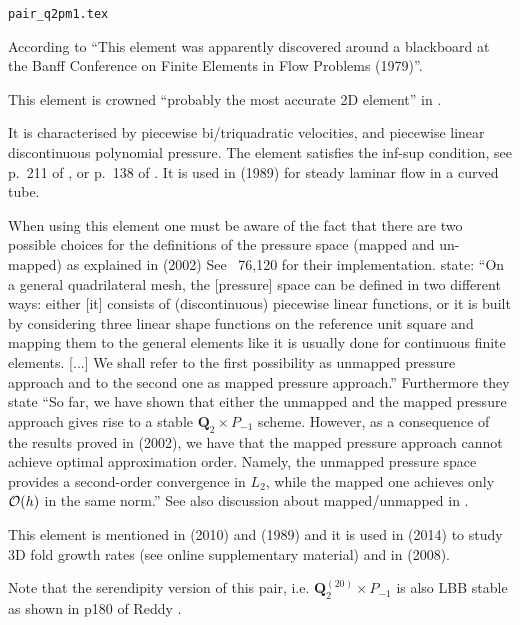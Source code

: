 \begin{flushright} {\tiny {\color{gray} \tt pair\_q2pm1.tex}} \end{flushright}

According to \textcite{bobf08} ``This element was apparently discovered 
around a blackboard at the Banff Conference on Finite Elements in Flow Problems (1979)''.

\begin{center}

\end{center}

This element is crowned ``probably the most accurate 2D element''
in \textcite{grsa}.

It is characterised by piecewise bi/triquadratic velocities, 
and piecewise linear discontinuous polynomial pressure. 
The element satisfies the inf-sup condition, see p.~211 of \textcite{hugh}, or 
p.~138 of \textcite{elsw}.
It is used in \textcite{vavs89} (1989) for steady laminar flow in a curved tube. 

When using this element one must be aware of the fact that there are 
two possible choices for the definitions of the pressure space (mapped and un-mapped) as explained
in \textcite{boga02} (2002) 
See \stone~76,120 for their implementation.
\textcite{bobf08} state: ``On a general quadrilateral mesh, the [pressure] space 
can be defined in two different ways: either [it] 
consists of (discontinuous) piecewise linear functions, or it is built
by considering three linear shape functions on the reference unit square and mapping
them to the general elements like it is usually done for continuous finite elements. [...]
We shall refer to the first possibility as unmapped pressure approach and to the
second one as mapped pressure approach.''
Furthermore they state ``So far, we have shown that either the unmapped and the mapped pressure 
approach gives rise to a stable ${\bm Q}_2\times P_{-1}$ scheme. However, as a consequence of the
results proved in \textcite{arbf02} (2002), we have that the mapped pressure approach cannot achieve 
optimal approximation order. Namely, the unmapped pressure space provides a second-order convergence 
in $L_2$, while the mapped one achieves only ${\cal O}(h)$ in the same norm.''
See also discussion about mapped/unmapped in \textcite{bobf13}.

This element is mentioned in \textcite{kaus10} (2010) and \textcite{pefc89} (1989) 
and it is used in \textcite{freh14} (2014) to study 3D fold growth rates 
(see online supplementary material) and in \textcite{schm08} (2008).

Note that the serendipity version of this pair, i.e. ${\bm Q}_2^{(20)}\times P_{-1}$ is also LBB stable
as shown in p180 of Reddy \cite{reddybook2}.


